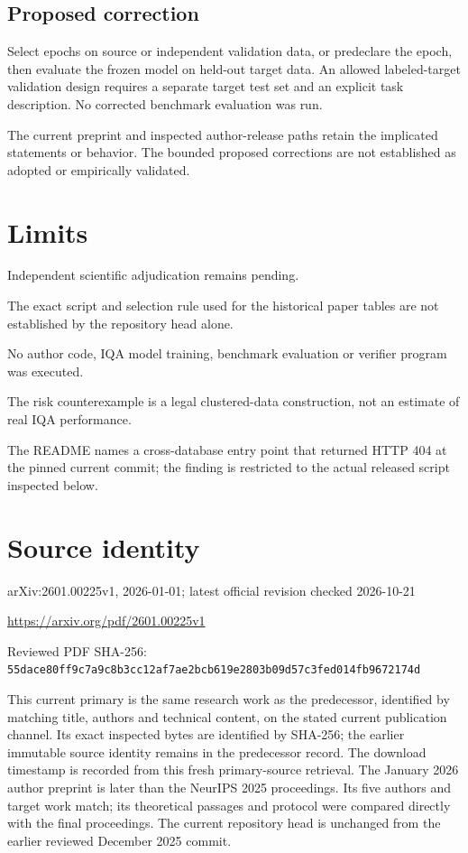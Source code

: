 \documentclass[11pt]{article}
\begin{document}
\subsection*{Proposed correction}

Select epochs on source or independent validation data, or predeclare the epoch, then evaluate the frozen model on held-out target data. An allowed labeled-target validation design requires a separate target test set and an explicit task description. No corrected benchmark evaluation was run.

The current preprint and inspected author-release paths retain the implicated statements or behavior. The bounded proposed corrections are not established as adopted or empirically validated.

\section*{Limits}

Independent scientific adjudication remains pending.\par

The exact script and selection rule used for the historical paper tables are not established by the repository head alone.\par

No author code, IQA model training, benchmark evaluation or verifier program was executed.\par

The risk counterexample is a legal clustered-data construction, not an estimate of real IQA performance.\par

The README names a cross-database entry point that returned HTTP 404 at the pinned current commit; the finding is restricted to the actual released script inspected below.\par

\section*{Source identity}

arXiv:2601.00225v1, 2026-01-01; latest official revision checked 2026-10-21

\url{https://arxiv.org/pdf/2601.00225v1}

Reviewed PDF SHA-256: \nolinkurl{55dace80ff9c7a9c8b3cc12af7ae2bcb619e2803b09d57c3fed014fb9672174d}

This current primary is the same research work as the predecessor, identified by matching title, authors and technical content, on the stated current publication channel. Its exact inspected bytes are identified by SHA-256; the earlier immutable source identity remains in the predecessor record. The download timestamp is recorded from this fresh primary-source retrieval. The January 2026 author preprint is later than the NeurIPS 2025 proceedings. Its five authors and target work match; its theoretical passages and protocol were compared directly with the final proceedings. The current repository head is unchanged from the earlier reviewed December 2025 commit.
\end{document}
